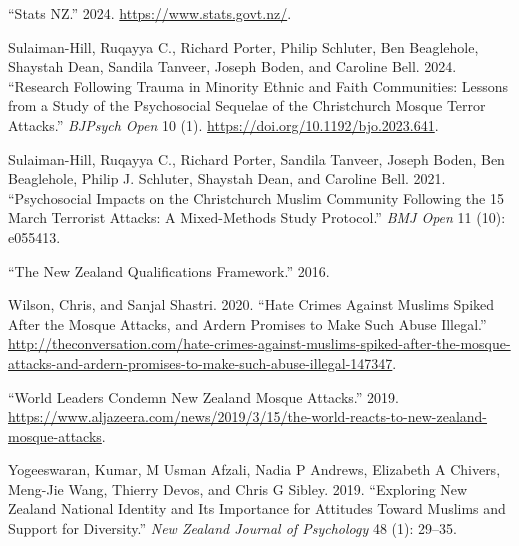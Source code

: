 \documentclass[
]{interact}
\newlength{\cslhangindent}
\newenvironment{CSLReferences}[2] %
 {\begin{list}{}{%
  \setlength{\itemindent}{0pt}
  \setlength{\leftmargin}{0pt}
  \setlength{\parsep}{0pt}
  \ifodd #1
   \setlength{\leftmargin}{\cslhangindent}
   \setlength{\itemindent}{-1\cslhangindent}
  \fi
  \setlength{\itemsep}{#2\baselineskip}}}
 {\end{list}}
\begin{document}
\begin{CSLReferences}{1}{0}
{``Stats NZ.''} 2024. \url{https://www.stats.govt.nz/}.

Sulaiman-Hill, Ruqayya C., Richard Porter, Philip Schluter, Ben
Beaglehole, Shaystah Dean, Sandila Tanveer, Joseph Boden, and Caroline
Bell. 2024. {``Research Following Trauma in Minority Ethnic and Faith
Communities: Lessons from a Study of the Psychosocial Sequelae of the
Christchurch Mosque Terror Attacks.''} \emph{BJPsych Open} 10 (1).
\url{https://doi.org/10.1192/bjo.2023.641}.

Sulaiman-Hill, Ruqayya C., Richard Porter, Sandila Tanveer, Joseph
Boden, Ben Beaglehole, Philip J. Schluter, Shaystah Dean, and Caroline
Bell. 2021. {``Psychosocial Impacts on the {C}hristchurch {M}uslim
Community Following the 15 March Terrorist Attacks: A Mixed-Methods
Study Protocol.''} \emph{BMJ Open} 11 (10): e055413.

{``The New Zealand Qualifications Framework.''} 2016.

Wilson, Chris, and Sanjal Shastri. 2020. {``Hate Crimes Against
{M}uslims Spiked After the Mosque Attacks, and {A}rdern Promises to Make
Such Abuse Illegal.''}
\url{http://theconversation.com/hate-crimes-against-muslims-spiked-after-the-mosque-attacks-and-ardern-promises-to-make-such-abuse-illegal-147347}.

{``World Leaders Condemn New Zealand Mosque Attacks.''} 2019.
\url{https://www.aljazeera.com/news/2019/3/15/the-world-reacts-to-new-zealand-mosque-attacks}.

Yogeeswaran, Kumar, M Usman Afzali, Nadia P Andrews, Elizabeth A
Chivers, Meng-Jie Wang, Thierry Devos, and Chris G Sibley. 2019.
{``Exploring {N}ew {Z}ealand National Identity and Its Importance for
Attitudes Toward {M}uslims and Support for Diversity.''} \emph{New
Zealand Journal of Psychology} 48 (1): 29--35.

\end{CSLReferences}
\end{document}
